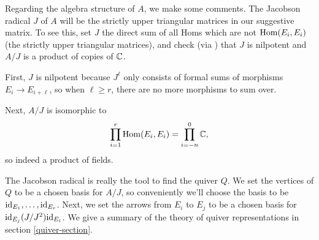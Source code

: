 \documentclass[12pt]{article}
\begin{document}
\begin{rmk}
    Regarding the algebra structure of $A$, we make some comments. The Jacobson radical $J$ of $A$ will be the strictly upper triangular matrices in our suggestive matrix. To see this, set $J$ the direct sum of all Homs which are not $\mathrm{Hom}(E_i,E_i)$ (the strictly upper triangular matrices), and check (via \cite[I.1.4]{quiver}) that $J$ is nilpotent and $A/J$ is a product of copies of $\mathbb{C}$.
    
    First, $J$ is nilpotent because $J^\ell$ only consists of formal sums of morphisms $E_i\to E_{i+\ell}$, so when $\ell\geq r$, there are no more morphisms to sum over.
    
    Next, $A/J$ is isomorphic to
    \[\prod_{i=1}^r \mathrm{Hom}(E_i,E_i) = \prod_{i=-n}^0 \mathbb{C},\]
    so indeed a product of fields.

    The Jacobson radical is really the tool to find the quiver $Q$. We set the vertices of $Q$ to be a chosen basis for $A/J$, so conveniently we'll choose the basis to be $\mathrm{id}_{E_1},\dots,\mathrm{id}_{E_r}$. Next, we set the arrows from $E_i$ to $E_j$ to be a chosen basis for $\mathrm{id}_{E_j} (J/J^2) \mathrm{id}_{E_i}$. We give a summary of the theory of quiver representations in section \ref{quiver-section}.
\end{rmk}
\end{document}
